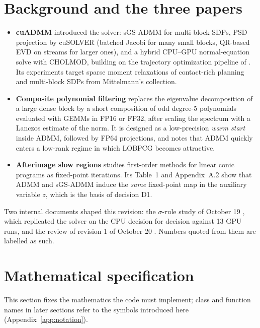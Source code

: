 \documentclass[11pt]{article}
\begin{document}
\section{Background and the three papers}\label{sec:background}

\begin{itemize}
  \item \textbf{cuADMM} \cite{cuadmm} introduced the solver: sGS-ADMM for multi-block SDPs, PSD
  projection by cuSOLVER (batched Jacobi for many small blocks, QR-based EVD on streams for larger
  ones), and a hybrid CPU--GPU normal-equation solve with CHOLMOD, building on the trajectory
  optimization pipeline of \cite{wafr}. Its experiments target sparse moment relaxations of
  contact-rich planning and multi-block SDPs from Mittelmann's collection.
  \item \textbf{Composite polynomial filtering} \cite{composite} replaces the eigenvalue decomposition
  of a large dense block by a short composition of odd degree-5 polynomials evaluated with GEMMs in
  FP16 or FP32, after scaling the spectrum with a Lanczos estimate of the norm. It is designed as a
  low-precision \emph{warm start} inside ADMM, followed by FP64 projections, and notes that ADMM quickly
  enters a low-rank regime \cite{kang2025local} in which LOBPCG becomes attractive.
  \item \textbf{Afterimage slow regions} \cite{afterimage} studies first-order methods for linear
  conic programs as fixed-point iterations. Its Table~1 and Appendix~A.2 show that ADMM and sGS-ADMM
  induce the \emph{same} fixed-point map in the auxiliary variable $z$, which is the basis of
  decision D1.
\end{itemize}
Two internal documents shaped this revision: the $\sigma$-rule study of October 19 \cite{sigmastudy},
which replicated the solver on the CPU decision for decision against 13 GPU runs, and the review of
revision 1 of October 20 \cite{review20}. Numbers quoted from them are labelled as such.

\section{Mathematical specification}\label{sec:math}

This section fixes the mathematics the code must implement; class and function names in later sections
refer to the symbols introduced here (Appendix~\ref{app:notation}).
\end{document}
